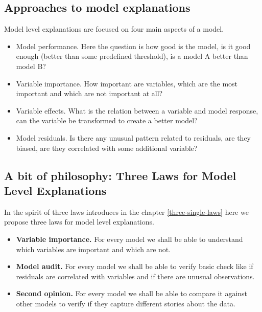 \documentclass[]{krantz}
\providecommand{\tightlist}{%
  \setlength{\itemsep}{0pt}\setlength{\parskip}{0pt}}
\theoremstyle{definition}
\theoremstyle{definition}
\theoremstyle{definition}
\theoremstyle{remark}
\begin{document}
\hypertarget{approaches-to-model-explanations}{%
\subsection{Approaches to model
explanations}\label{approaches-to-model-explanations}}

Model level explanations are focused on four main aspects of a model.

\begin{itemize}
\tightlist
\item
  Model performance. Here the question is how good is the model, is it
  good enough (better than some predefined threshold), is a model A
  better than model B?
\item
  Variable importance. How important are variables, which are the most
  important and which are not important at all?
\item
  Variable effects. What is the relation between a variable and model
  response, can the variable be transformed to create a better model?
\item
  Model residuals. Is there any unusual pattern related to residuals,
  are they biased, are they correlated with some additional variable?
\end{itemize}

\hypertarget{a-bit-of-philosophy-three-laws-for-model-level-explanations}{%
\subsection{A bit of philosophy: Three Laws for Model Level
Explanations}\label{a-bit-of-philosophy-three-laws-for-model-level-explanations}}

In the spirit of three laws introduces in the chapter
\ref{three-single-laws} here we propose three laws for model level
explanations.

\begin{itemize}
\tightlist
\item
  \textbf{Variable importance.} For every model we shall be able to
  understand which variables are important and which are not.
\item
  \textbf{Model audit.} For every model we shall be able to verify basic
  check like if residuals are correlated with variables and if there are
  unusual observations.
\item
  \textbf{Second opinion.} For every model we shall be able to compare
  it against other models to verify if they capture different stories
  about the data.
\end{itemize}
\end{document}
